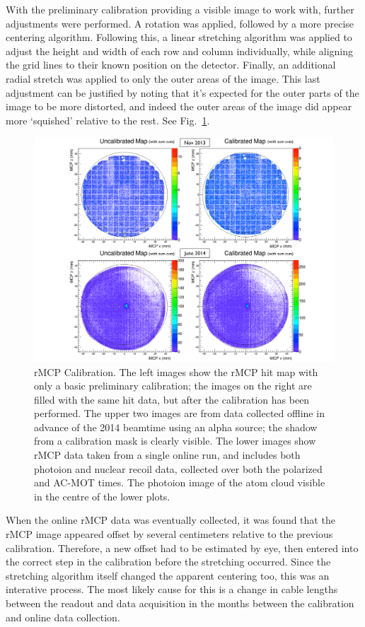 With the preliminary calibration providing a visible image to work with, further adjustments were performed.  A rotation was applied, followed by a more precise centering algorithm. Following this, a linear stretching algorithm was applied to adjust the height and width of each row and column individually, while aligning the grid lines to their known position on the detector.  Finally, an additional radial stretch was applied to only the outer areas of the image.  This last adjustment can be justified by noting that it's expected for the outer parts of the image to be more distorted, and indeed the outer areas of the image did appear more `squished' relative to the rest.  See Fig.~\ref{fig:rmcp_calibration}.  
\begin{figure}[h!tb]
	\centering
	\includegraphics[width=.999\linewidth]
	{Figures/rMCP_Calibration}
	\caption[rMCP Calibration]{rMCP Calibration.  The left images show the rMCP hit map with only a basic preliminary calibration; the images on the right are filled with the same hit data, but after the calibration has been performed.  The upper two images are from data collected offline in advance of the 2014 beamtime using an alpha source; the shadow from a calibration mask is clearly visible.  The lower images show rMCP data taken from a single online run, and includes both photoion and nuclear recoil data, collected over both the polarized and AC-MOT times.  The photoion image of the atom cloud visible in the centre of the lower plots.}
	\label{fig:rmcp_calibration}
\end{figure}

When the online rMCP data was eventually collected, it was found that the rMCP image appeared offset by several centimeters relative to the previous calibration.  Therefore, a new offset had to be estimated by eye, then entered into the correct step in the calibration before the stretching occurred.  Since the stretching algorithm itself changed the apparent centering too, this was an interative process.  The most likely cause for this is a change in cable lengths between the readout and data acquisition in the months between the calibration and online data collection.

